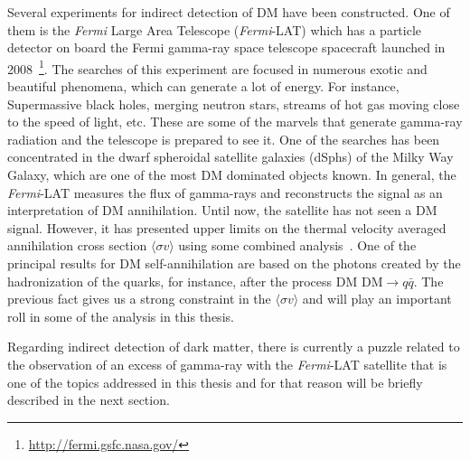 \begin{itemize}
Several experiments for indirect detection of DM have been constructed. One of them is the \textit{Fermi} Large Area Telescope (\textit{Fermi}-LAT) which has a particle detector on board the Fermi gamma-ray space telescope spacecraft launched in 2008~\footnote{\url{http://fermi.gsfc.nasa.gov/}}. 
%
The searches of this experiment are focused in numerous exotic and beautiful phenomena, which can generate a lot of energy. For instance, Supermassive black holes, merging neutron stars, streams of hot gas moving close to the speed of light, etc. 
These are some of the marvels that generate gamma-ray radiation and the telescope is prepared to see it.
%
One of the searches has been concentrated in the dwarf spheroidal satellite galaxies (dSphs) of the Milky Way Galaxy, which are one of the most DM dominated objects known. 
In general, the \textit{Fermi}-LAT measures the flux of gamma-rays and reconstructs the signal as an interpretation of DM annihilation. 
Until now, the satellite has not seen a DM signal. 
However, it has presented upper limits on the thermal velocity averaged annihilation cross section $\langle \sigma v \rangle$ using some combined analysis~\cite{Ackermann:2015zua}. 
One of the principal results for DM self-annihilation are based on the photons created by the hadronization of the quarks, for instance, after the process $\text{DM DM} \to q\bar{q}$. 
The previous fact gives us a strong constraint in the $\langle \sigma v \rangle$ and will play an important roll in some of the analysis in this thesis.
 
Regarding indirect detection of dark matter, there is currently a puzzle related to the observation of an excess of gamma-ray with the \textit{Fermi}-LAT satellite that is one of the topics addressed in this thesis and for that reason will be briefly described in the next section.

\end{itemize}











